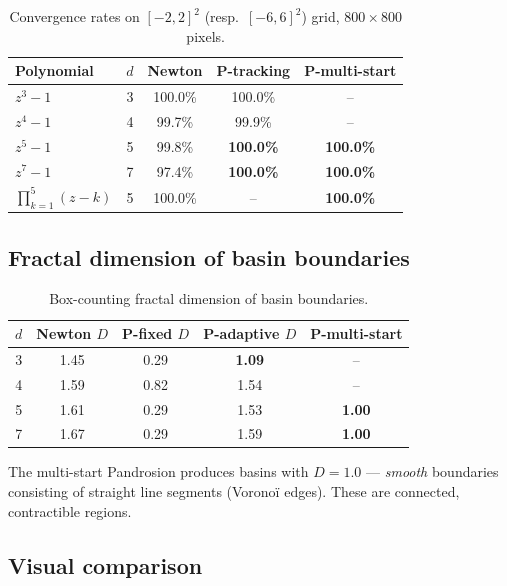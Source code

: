 \documentclass[11pt,a4paper]{article}
\theoremstyle{definition}
\theoremstyle{remark}
\begin{document}
\begin{table}[h]
\centering
\caption{Convergence rates on $[-2, 2]^2$ (resp.\ $[-6, 6]^2$) grid, $800 \times 800$ pixels.}
\label{tab:convergence}
\begin{tabular}{l c ccc}
\toprule
Polynomial & $d$ & Newton & P-tracking & P-multi-start \\
\midrule
$z^3 - 1$ & 3 & 100.0\% & 100.0\% & -- \\
$z^4 - 1$ & 4 & 99.7\% & 99.9\% & -- \\
$z^5 - 1$ & 5 & 99.8\% & \textbf{100.0\%} & \textbf{100.0\%} \\
$z^7 - 1$ & 7 & 97.4\% & \textbf{100.0\%} & \textbf{100.0\%} \\
\midrule
$\prod_{k=1}^5(z-k)$ & 5 & 100.0\% & -- & \textbf{100.0\%} \\
\bottomrule
\end{tabular}
\end{table}

\subsection{Fractal dimension of basin boundaries}

\begin{table}[h]
\centering
\caption{Box-counting fractal dimension of basin boundaries.}
\label{tab:fractal}
\begin{tabular}{c ccc c}
\toprule
$d$ & Newton $D$ & P-fixed $D$ & P-adaptive $D$ & P-multi-start \\
\midrule
3 & 1.45 & 0.29 & \textbf{1.09} & -- \\
4 & 1.59 & 0.82 & 1.54 & -- \\
5 & 1.61 & 0.29 & 1.53 & \textbf{1.00} \\
7 & 1.67 & 0.29 & 1.59 & \textbf{1.00} \\
\bottomrule
\end{tabular}
\end{table}

The multi-start Pandrosion produces basins with $D = 1.0$ --- \emph{smooth} boundaries consisting of straight line segments (Vorono\"i edges).  These are connected, contractible regions.

\subsection{Visual comparison}
\end{document}

